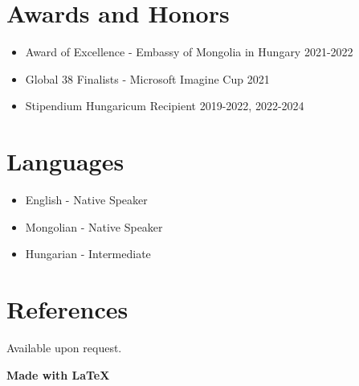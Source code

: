 \documentclass[11pt,a4paper]{article}
\begin{document}
\section*{Awards and Honors}

\begin{itemize}
    \item Award of Excellence - Embassy of Mongolia in Hungary 2021-2022
    \item Global 38 Finalists - Microsoft Imagine Cup 2021
    \item Stipendium Hungaricum Recipient 2019-2022, 2022-2024
\end{itemize}

\section*{Languages}

\begin{itemize}
    \item English - Native Speaker
    \item Mongolian - Native Speaker
    \item Hungarian - Intermediate
\end{itemize}

\section*{References}

Available upon request.



\begin{center}
  \textbf{Made with \LaTeX}
\end{center}
\end{document}
